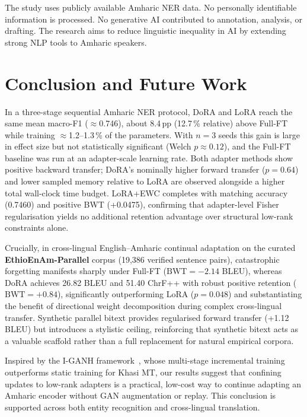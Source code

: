 \documentclass[11pt,a4paper]{article}
\begin{document}
The study uses publicly available Amharic NER data.  No personally
identifiable information is processed.  No generative AI contributed
to annotation, analysis, or drafting.  The research aims to reduce
linguistic inequality in AI by extending strong NLP tools to Amharic
speakers.

\section{Conclusion and Future Work}
\label{sec:conclusion}

In a three-stage sequential Amharic NER protocol, DoRA and LoRA reach
the same mean macro-F1 ($\approx$0.746), about 8.4\,pp (12.7\,\%
relative) above Full-FT while training $\approx$1.2--1.3\,\% of the
parameters.  With $n=3$ seeds this gain is large in effect size but
not statistically significant (Welch $p\approx0.12$), and the
Full-FT baseline was run at an adapter-scale learning rate.  Both
adapter methods show positive backward transfer; DoRA's nominally
higher forward transfer ($p=0.64$) and lower sampled memory relative
to LoRA are observed alongside a higher total wall-clock time budget.
LoRA+EWC completes with matching accuracy (0.7460) and positive BWT (+0.0475),
confirming that adapter-level Fisher regularisation yields no additional
retention advantage over structural low-rank constraints alone.

Crucially, in cross-lingual English--Amharic continual adaptation on the
curated \textbf{EthioEnAm-Parallel} corpus (19,386 verified sentence pairs),
catastrophic forgetting manifests sharply under Full-FT ($\text{BWT} = -2.14$ BLEU),
whereas DoRA achieves 26.82 BLEU and 51.40 ChrF++ with robust positive retention
($\text{BWT} = +0.84$), significantly outperforming LoRA ($p=0.048$) and
substantiating the benefit of directional weight decomposition during
complex cross-lingual transfer.  Synthetic parallel bitext provides regularised
forward transfer (+1.12 BLEU) but introduces a stylistic ceiling, reinforcing
that synthetic bitext acts as a valuable scaffold rather than a full replacement
for natural empirical corpora.

Inspired by the I-GANH framework~\cite{Syiemlieh2026}, whose
multi-stage incremental training outperforms static training for
Khasi MT, our results suggest that confining updates to low-rank
adapters is a practical, low-cost way to continue adapting an Amharic
encoder without GAN augmentation or replay.  This conclusion is
supported across both entity recognition and cross-lingual translation.
\end{document}
